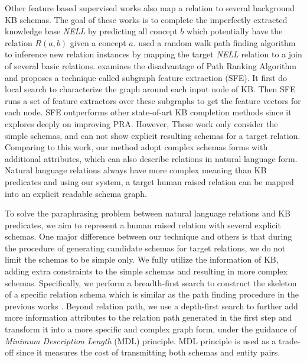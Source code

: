 Other feature based supervised works \cite{gardnerefficient,gardner2014incorporating,lao2011random} also map a relation to several background KB schemas. The goal of these works is to complete the imperfectly extracted knowledge base \textit{NELL} \cite{carlson2010toward} by predicting all concept $b$ which potentially have the relation $R(a, b)$ given a concept $a$. \cite{lao2011random} used a random walk path finding algorithm to inference new relation instances by mapping the target \textit{NELL} relation to a join of several basic relations. \cite{gardnerefficient} examines the disadvantage of Path Ranking Algorithm and proposes a technique called subgraph feature extraction (SFE). It first do local search to characterize the graph around each input node of KB. Then SFE runs a set of feature extractors over these subgraphs to get the feature vectors for each node. SFE outperforms other state-of-art KB completion methods since it explores deeply on improving PRA. However, These work only consider the simple schemas, and can not show explicit resulting schemas for a target relation. Comparing to this work, our method adopt complex schemas forms with additional attributes, which can also describe relations in natural language form. Natural language relations always have more complex meaning than KB predicates and using our system, a target human raised relation can be mapped into an explicit readable schema graph.

To solve the paraphrasing problem between natural language relations and KB predicates, we aim to represent a human raised relation with several explicit schemas. One major difference between our technique and others is that during the procedure of generating candidate schemas for target relations, we do not limit the schemas to be simple only. We fully utilize the information of KB, adding extra constraints to the simple schemas and resulting in more complex schemas. Specifically, we perform a breadth-first search to construct the skeleton of a specific relation schema which is similar as the path finding procedure in the previous works \cite{gardnerefficient,gardner2014incorporating,lao2011random,zhang2012ontological}. Beyond relation path, we use a depth-first search to further add more information attributes to the relation path generated in the first step and transform it into a more specific and complex graph form, under the guidance of \textit{Minimum Description Length} (MDL) \cite{fisher2008dirt,grunwald2007minimum} principle. MDL principle is used as a trade-off since it measures the cost of transmitting both schemas and entity pairs.

